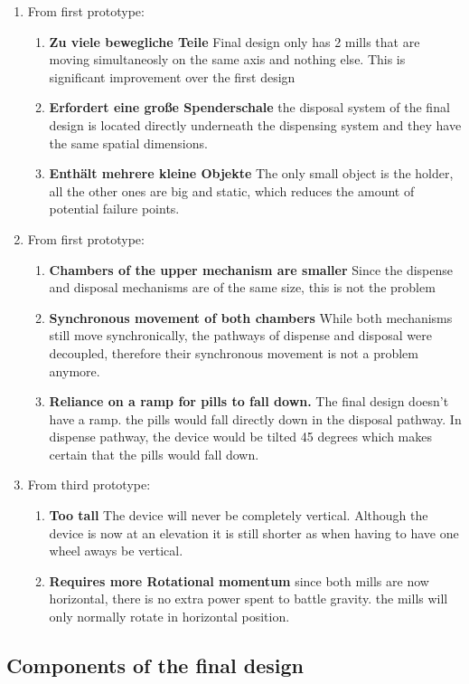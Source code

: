 \begin{enumerate}
	\item{From first prototype:}
	\begin{enumerate}
		\item{\textbf{Zu viele bewegliche Teile}} Final design only has 2 mills that are moving simultaneosly on the same axis and nothing else. This is significant improvement over the first design
		\item{\textbf{Erfordert eine große Spenderschale}} the disposal system of the final design is located directly underneath the dispensing system and they have the same spatial dimensions.
		\item{\textbf{Enthält mehrere kleine Objekte}} The only small object is the holder, all the other ones are big and static, which reduces the amount of potential failure points.
	\end{enumerate}
	\item{From first prototype:}
	\begin{enumerate}
		\item{\textbf{Chambers of the upper mechanism are smaller}} Since the dispense and disposal mechanisms are of the same size, this is not the problem
		\item{\textbf{Synchronous movement of both chambers}} While both mechanisms still move synchronically, the pathways of dispense and disposal were decoupled, therefore their synchronous movement is not a problem anymore.
		\item{\textbf{Reliance on a ramp for pills to fall down.}} The final design doesn't have a ramp. the pills would fall directly down in the disposal pathway. In dispense pathway, the device would be tilted 45 degrees which makes certain that the pills would fall down.
	\end{enumerate}
	\item{From third prototype:}
	\begin{enumerate}
		\item{\textbf{Too tall}} The device will never be completely vertical. Although the device is now at an elevation it is still shorter as when having to have one wheel aways be vertical.
		\item{\textbf{Requires more Rotational momentum}} since both mills are now horizontal, there is no extra power spent to battle gravity. the mills will only normally rotate in horizontal position.
	\end{enumerate}
\end{enumerate}
\subsection{Components of the final design}
\